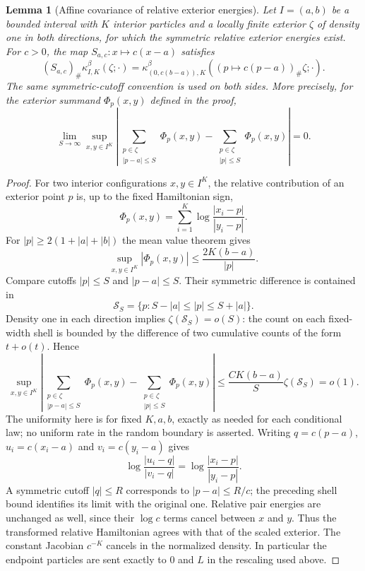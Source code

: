 \documentclass[11pt,reqno]{amsart}
\numberwithin{equation}{section}
\newtheorem{lemma}[theorem]{Lemma}
\theoremstyle{definition}
\theoremstyle{remark}
\newcommand{\1}{\mathbf 1}
\begin{document}
\begin{samepage}
\begin{lemma}[Affine covariance of relative exterior energies]
\label{lem:affine-covariance}
Let $I=(a,b)$ be a bounded interval with $K$ interior particles and a
locally finite exterior $\zeta$ of density one in both directions, for
which the symmetric relative exterior energies exist. For $c>0$, the
map $S_{a,c}:x\mapsto c(x-a)$ satisfies
\begin{equation}\label{eq:affine-kernel}
(S_{a,c})_\#\kappa_{I,K}^\beta(\zeta;\cdot)
 =\kappa_{(0,c(b-a)),K}^\beta
      ((p\mapsto c(p-a))_\#\zeta;\cdot).
\end{equation}
The same symmetric-cutoff convention is used on both sides. More
precisely, for the exterior summand $\Phi_p(x,y)$ defined in the proof,
\begin{equation}\label{eq:cutoff-center-error}
\lim_{S\to\infty}\sup_{x,y\in I^K}
\left|\sum_{\substack{p\in\zeta\\|p-a|\le S}}\Phi_p(x,y)
      -\sum_{\substack{p\in\zeta\\|p|\le S}}\Phi_p(x,y)\right|=0.
\end{equation}
\end{lemma}
\end{samepage}

\begin{proof}
For two interior configurations $x,y\in I^K$, the relative contribution
of an exterior point $p$ is, up to the fixed Hamiltonian sign,
\[
\Phi_p(x,y)=\sum_{i=1}^K
                    \log\frac{|x_i-p|}{|y_i-p|}.
\]
For $|p|\ge2(1+|a|+|b|)$ the mean value theorem gives
\[
\sup_{x,y\in I^K}|\Phi_p(x,y)|\le\frac{2K(b-a)}{|p|}.
\]
Compare cutoffs $|p|\le S$ and $|p-a|\le S$. Their symmetric
difference is contained in
\[
\mathcal S_S=\{p:S-|a|\le |p|\le S+|a|\}.
\]
Density one in each direction implies
$\zeta(\mathcal S_S)=o(S)$: the count on each fixed-width shell is
bounded by the difference of two cumulative counts of the form
$t+o(t)$. Hence
\[
\sup_{x,y\in I^K}
\left|\sum_{\substack{p\in\zeta\\|p-a|\le S}}\Phi_p(x,y)
     -\sum_{\substack{p\in\zeta\\|p|\le S}}\Phi_p(x,y)\right|
\le\frac{C K(b-a)}{S}\zeta(\mathcal S_S)=o(1).
\]
The uniformity here is for fixed $K,a,b$, exactly as needed for each
conditional law; no uniform rate in the random boundary is asserted.
Writing $q=c(p-a)$, $u_i=c(x_i-a)$ and $v_i=c(y_i-a)$ gives
\[
\log\frac{|u_i-q|}{|v_i-q|}
=\log\frac{|x_i-p|}{|y_i-p|}.
\]
A symmetric cutoff $|q|\le R$ corresponds to $|p-a|\le R/c$;
the preceding shell bound identifies its limit with the original
one. Relative pair energies are unchanged as well, since their
$\log c$ terms cancel between $x$ and $y$. Thus the transformed
relative Hamiltonian agrees with that of the scaled exterior. The
constant Jacobian $c^{-K}$ cancels in the normalized density. In
particular the endpoint particles are sent exactly to $0$ and $L$ in
the rescaling used above.
\end{proof}
\end{document}
